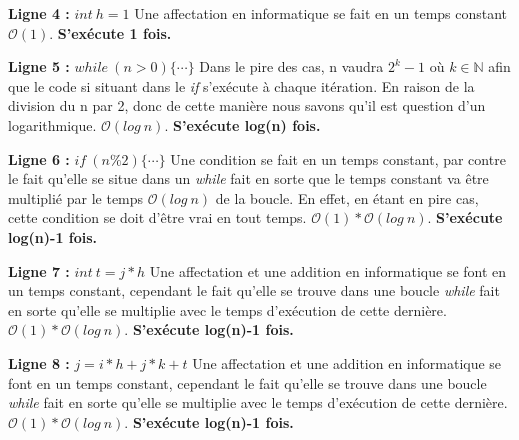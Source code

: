\documentclass[12pt]{article}
\begin{document}
        \noindent \textbf{Ligne 4 :} \( int \: h = 1 \) \newline
        Une affectation en informatique se fait en un temps constant
        \( \mathcal{O}(1) \). \newline
		\textbf{S'exécute 1 fois.} \newline

        \noindent \textbf{Ligne 5 :} \( while \: (n>0) \{ \cdots \} \) \newline
        Dans le pire des cas, n vaudra \( 2^k - 1 \) où \(k \in \mathbb{N} \) afin que le code si situant dans le \textit{if} s'exécute à chaque itération. En raison de la division du n par 2,  donc de cette manière nous savons qu'il est question d'un logarithmique.
        \( \mathcal{O}(log \: n) \). \newline
		\textbf{S'exécute log(n) fois.} \newline

        \noindent \textbf{Ligne 6 :}  \( if \: (n\%2)\{ \cdots \} \) \newline
        Une condition se fait en un temps constant, par contre le fait qu'elle se situe dans un \textit{while} fait en sorte que le temps constant va être multiplié par le temps \( \mathcal{O}(log \: n) \) de la boucle. En effet, en étant en pire cas, cette condition se doit d'être vrai en tout temps.
        \( \mathcal{O}(1)*\mathcal{O}(log \: n) \). \newline
		\textbf{S'exécute log(n)-1 fois.} \newline

        \noindent \textbf{Ligne 7 :} \( int \: t = j*h \) \newline
        Une affectation et une addition en informatique se font en un temps constant, cependant le fait qu'elle se trouve dans une boucle \textit{while} fait en sorte qu'elle se multiplie avec le temps d'exécution de cette dernière.
        \( \mathcal{O}(1)*\mathcal{O}(log \: n) \). \newline
		\textbf{S'exécute log(n)-1 fois.} \newline

        \noindent \textbf{Ligne 8 :} \( j = i*h + j*k + t \) \newline
  	    Une affectation et une addition en informatique se font en un temps constant, cependant le fait qu'elle se trouve dans une boucle \textit{while} fait en sorte qu'elle se multiplie avec le temps d'exécution de cette dernière.
        \( \mathcal{O}(1)*\mathcal{O}(log \: n) \). \newline
 		\textbf{S'exécute log(n)-1 fois.} \newline
\end{document}
